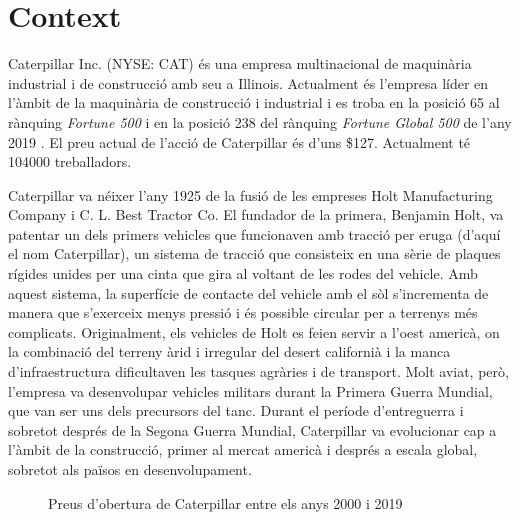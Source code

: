 \documentclass{article}
\numberwithin{table}{section}
\numberwithin{figure}{section}
\numberwithin{equation}{section}
\begin{document}
\section{Context}
Caterpillar Inc. (NYSE: CAT) és una empresa multinacional de maquinària industrial i de construcció amb seu a Illinois. Actualment és l'empresa líder en l'àmbit de la maquinària de construcció i industrial \cite{cat} i es troba en la posició 65 al rànquing \emph{Fortune 500} i en la posició 238 del rànquing \emph{Fortune Global 500} de l'any 2019 \cite{fortune,global}. El preu actual de l'acció de Caterpillar és d'uns \$127. Actualment té \num{104000} treballadors. 

Caterpillar va néixer l'any 1925 de la fusió de les empreses Holt Manufacturing Company i C. L. Best Tractor Co. El fundador de la primera, Benjamin Holt, va patentar un dels primers vehicles que funcionaven amb tracció per eruga (d'aquí el nom Caterpillar), un sistema de tracció que consisteix en una sèrie de plaques rígides unides per una cinta que gira al voltant de les rodes del vehicle. Amb aquest sistema, la superfície de contacte del vehicle amb el sòl s'incrementa de manera que s'exerceix menys pressió i és possible circular per a terrenys més complicats. Originalment, els vehicles de Holt es feien servir a l'oest americà, on la combinació del terreny àrid i irregular del desert californià i la manca d'infraestructura dificultaven les tasques agràries i de transport. Molt aviat, però, l'empresa va desenvolupar vehicles militars durant la Primera Guerra Mundial, que van ser uns dels precursors del tanc. Durant el període d'entreguerra i sobretot després de la Segona Guerra Mundial, Caterpillar va evolucionar cap a l'àmbit de la construcció, primer al mercat americà i després a escala global, sobretot als països en desenvolupament. 

\begin{figure}[htb]
\centering \sffamily \small

\caption{Preus d'obertura de Caterpillar entre els anys 2000 i 2019}
\label{fig:tancament}
\end{figure}
\end{document}
